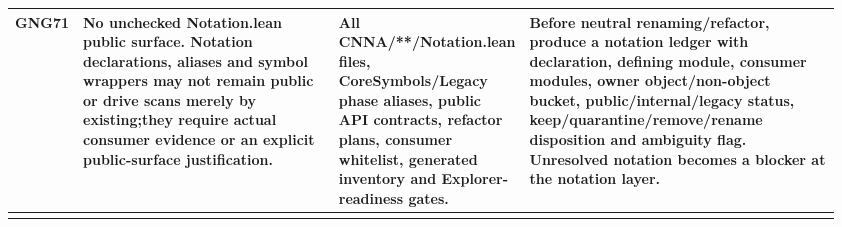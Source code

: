 \begin{longtable}{L{0.045\linewidth} L{0.345\linewidth} L{0.185\linewidth} L{0.39\linewidth}}
\hline
\addlinespace[0.24em]
GNG71 & No unchecked Notation.lean public surface. Notation declarations, aliases and symbol wrappers may not remain public or drive scans merely by existing;\newline they require actual consumer evidence or an explicit public-surface justification. & All CNNA/\allowbreak{}**/\allowbreak{}Notation.lean files, CoreSymbols/\allowbreak{}Legacy phase aliases, public API contracts, refactor plans, consumer whitelist, generated inventory and Explorer-readiness gates. & Before neutral renaming/\allowbreak{}refactor, produce a notation ledger with declaration, defining module, consumer modules, owner object/\allowbreak{}non-object bucket, public/\allowbreak{}internal/\allowbreak{}legacy status, keep/\allowbreak{}quarantine/\allowbreak{}remove/\allowbreak{}rename disposition and ambiguity flag. Unresolved notation becomes a blocker at the notation layer.\\
\hline
\addlinespace[0.24em]
\end{longtable}
\normalsize
